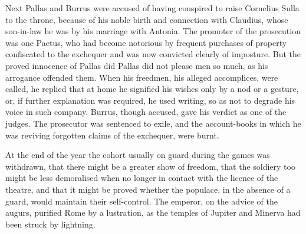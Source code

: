 
Next Pallas and Burrus were accused of having conspired to raise Cornelius Sulla to the throne, because of his noble birth and connection with Claudius, whose son-in-law he was by his marriage with Antonia. The promoter of the prosecution was one Paetus, who had become notorious by frequent purchases of property confiscated to the exchequer and was now convicted clearly of imposture. But the proved innocence of Pallas did Pallas did not please men so much, as his arrogance offended them. When his freedmen, his alleged accomplices, were called, he replied that at home he signified his wishes only by a nod or a gesture, or, if further explanation was required, he used writing, so as not to degrade his voice in such company. Burrus, though accused, gave his verdict as one of the judges. The prosecutor was sentenced to exile, and the account-books in which he was reviving forgotten claims of the exchequer, were burnt.


At the end of the year the cohort usually on guard during the games was withdrawn, that there might be a greater show of freedom, that the soldiery too might be less demoralised when no longer in contact with the licence of the theatre, and that it might be proved whether the populace, in the absence of a guard, would maintain their self-control. The emperor, on the advice of the augurs, purified Rome by a lustration, as the temples of Jupiter and Minerva had been struck by lightning.


